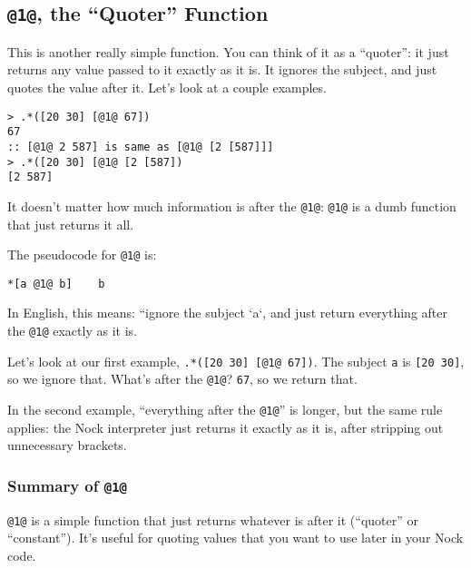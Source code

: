 \documentclass[twoside]{article}
\begin{document}
\subsection{\lstinline[style=inlinecode]{@1@}, the “Quoter” Function}
\label{sxn:nock1}

This is another really simple function. You can think of it as a “quoter”: it just returns any value passed to it exactly as it is. It ignores the subject, and just quotes the value after it. Let's look at a couple examples.

\begin{lstlisting}[style=listingcode]
> .*([20 30] [@1@ 67])
67
:: [@1@ 2 587] is same as [@1@ [2 [587]]]
> .*([20 30] [@1@ [2 [587])
[2 587]
\end{lstlisting}

It doesn't matter how much information is after the \lstinline[style=inlinecode]{@1@}: \lstinline[style=inlinecode]{@1@} is a dumb function that just returns it all.

The pseudocode for \lstinline[style=inlinecode]{@1@} is:

\begin{lstlisting}[style=listingcode]
*[a @1@ b]    b
\end{lstlisting}

In English, this means: ``ignore the subject `a`, and just return everything after the \lstinline[style=inlinecode]{@1@} exactly as it is.

Let's look at our first example, \lstinline[style=inlinecode]{.*([20 30] [@1@ 67])}. The subject \lstinline[style=inlinecode]{a} is \lstinline[style=inlinecode]{[20 30]}, so we ignore that. What's after the \lstinline[style=inlinecode]{@1@}? \lstinline[style=inlinecode]{67}, so we return that.

In the second example, “everything after the \lstinline[style=inlinecode]{@1@}” is longer, but the same rule applies: the Nock interpreter just returns it exactly as it is, after stripping out unnecessary brackets.

\subsubsection{Summary of \lstinline[style=inlinecode]{@1@}}

\lstinline[style=inlinecode]{@1@} is a simple function that just returns whatever is after it (“quoter” or “constant”). It's useful for quoting values that you want to use later in your Nock code.
\end{document}
